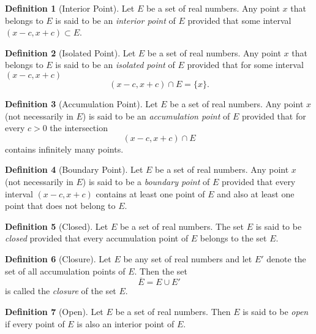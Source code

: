 \documentclass[11pt]{article}
\newcommand{\set}[1]{\{#1\}}
\theoremstyle{definition}
\newtheorem{definition}{Definition}[section]
\begin{document}
\begin{definition} [Interior Point]
	Let $ E $ be a set of real numbers. Any point $ x $ that belongs to $ E $ is said to be an \textit{interior point} of $ E $ provided that some interval $ (x - c, x + c) \subset E $.
\end{definition}

\setcounter{definition}{2}
\begin{definition} [Isolated Point]
	Let $ E $ be a set of real numbers. Any point $ x $ that belongs to $ E $ is said to be an \textit{isolated point} of $ E $ provided that for some interval $(x - c, x + c)$
		$$(x - c, x + c) \cap E = \set{x}.$$
\end{definition}

\setcounter{definition}{4}
\begin{definition} [Accumulation Point]
	Let $ E $ be a set of real numbers. Any point $ x $ (not necessarily in	$ E $) is said to be an \textit{accumulation point} of $ E $ provided that for every $ c > 0 $ the intersection
		$$ (x - c, x + c) \cap E $$
	contains infinitely many points.
\end{definition}

\setcounter{definition}{6}
\begin{definition} [Boundary Point]
	Let $ E $ be a set of real numbers. Any point $ x $ (not necessarily in $ E $) is said to be a \textit{boundary point} of $ E $ provided that every interval $ (x - c, x + c) $ contains at least one point of $ E $ and also at least one point that does not belong to $ E $.
\end{definition}

\setcounter{definition}{8}
\begin{definition} [Closed]
	Let $ E $ be a set of real numbers. The set $ E $ is said to be \textit{closed} provided that every accumulation point of $ E $ belongs to the set $ E $.
\end{definition}

\setcounter{definition}{10}
\begin{definition} [Closure]
	Let $ E $ be any set of real numbers and let $ E' $ denote the set of all accumulation points of $ E $. Then the set
		$$ \overline{E} = E \cup E'$$
	is called the \textit{closure} of the set $ E $.
\end{definition}


\begin{definition} [Open]
	Let $ E $ be a set of real numbers. Then $ E $ is said to be \textit{open} if every point of $ E $
	is also an interior point of $ E $.
\end{definition}
\end{document}
